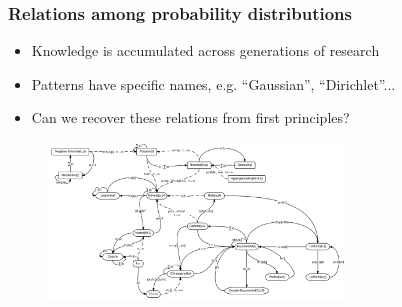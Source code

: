 \documentclass{beamer}
\begin{document}
  \begin{frame}
    \frametitle{Relations among probability distributions}
    \begin{itemize}
      \item Knowledge is accumulated across generations of research
      \item Patterns have specific names, e.g. ``Gaussian'', ``Dirichlet''...
      \item Can we recover these relations from first principles?
    \end{itemize}
    \begin{figure}[H]
      \centering
      \includegraphics[width=0.7\textwidth]{../clipart/distribution_relations.jpeg}
    \end{figure}
  \end{frame}
\end{document}
